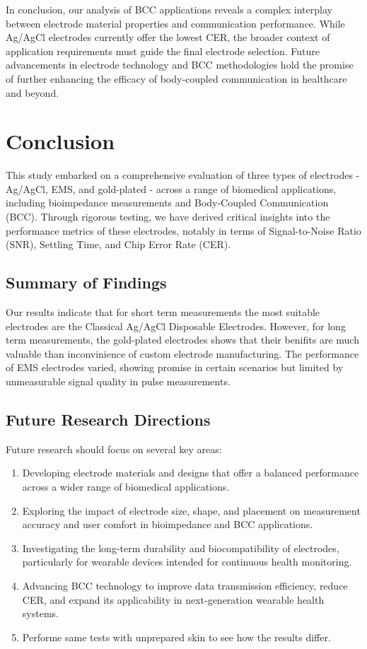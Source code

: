 \documentclass[conference]{IEEEtran}
\begin{document}
In conclusion, our analysis of BCC applications reveals a complex interplay between electrode material properties and communication performance. While Ag/AgCl electrodes currently offer the lowest CER, the broader context of application requirements must guide the final electrode selection. Future advancements in electrode technology and BCC methodologies hold the promise of further enhancing the efficacy of body-coupled communication in healthcare and beyond.

\section{Conclusion}

This study embarked on a comprehensive evaluation of three types of electrodes - Ag/AgCl, EMS, and gold-plated - across a range of biomedical applications, including bioimpedance measurements and Body-Coupled Communication (BCC). Through rigorous testing, we have derived critical insights into the performance metrics of these electrodes, notably in terms of Signal-to-Noise Ratio (SNR), Settling Time, and Chip Error Rate (CER).

\subsection{Summary of Findings}
Our results indicate that for short term measurements the most suitable electrodes are the Classical Ag/AgCl Disposable Electrodes. However, for long term measurements, the gold-plated electrodes shows that their benifits are much valuable than inconvinience of custom electrode manufacturing. The performance of EMS electrodes varied, showing promise in certain scenarios but limited by unmeasurable signal quality in pulse measurements.


\subsection{Future Research Directions}
Future research should focus on several key areas:
\begin{enumerate}
    \item Developing electrode materials and designs that offer a balanced performance across a wider range of biomedical applications.
    \item Exploring the impact of electrode size, shape, and placement on measurement accuracy and user comfort in bioimpedance and BCC applications.
    \item Investigating the long-term durability and biocompatibility of electrodes, particularly for wearable devices intended for continuous health monitoring.
    \item Advancing BCC technology to improve data transmission efficiency, reduce CER, and expand its applicability in next-generation wearable health systems.
    \item Performe same tests with unprepared skin to see how the results differ.
\end{enumerate}
\end{document}

